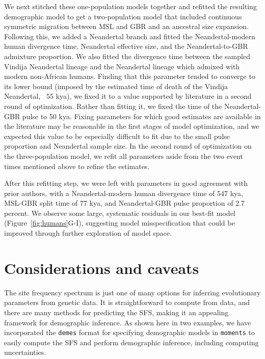 \documentclass[]{article}
\newcommand{\moments}{\texttt{moments}\xspace}
\newcommand{\demes}{\texttt{demes}\xspace}
\begin{document}
We next stitched these one-population models together and refitted the 
resulting demographic model to get a two-population model 
that included continuous symmetric 
migration between MSL and GBR and an ancestral size expansion. Following this,
we added a Neandertal branch and fitted the 
Neandertal-modern human divergence time, Neandertal effective size, and the 
Neandertal-to-GBR admixture proportion. We also fitted the divergence time 
between the sampled Vindija Neandertal lineage and the Neandertal lineage which 
admixed with modern non-African humans. Finding that this parameter tended to 
converge to its lower bound (imposed by the estimated time of death of the 
Vindija Neandertal, ~55 kya), we fixed it to a value supported by literature 
\citep[90 kya,][]{prufer2017high} in a second round of optimization.
Rather than fitting it, we fixed the time of the Neandertal-GBR pulse to 50 kya.
Fixing parameters for which good estimates are available in the literature 
\citep[see e.g.,][]{sumer2025earliest} may be reasonable in the first stages of 
model optimization, and we expected this value to be especially difficult to fit 
due to the small pulse proportion and Neandertal sample size. In the second 
round of optimization on the three-population model, we refit all parameters 
aside from the two event times mentioned above to refine the estimates. 

After this refitting step, we were left with parameters in good agreement with 
prior authors, with a Neandertal-modern human divergence time of 547 kya, 
MSL-GBR split time of 77 kya, and Neandertal-GBR pulse proportion of 2.7 
percent. We observe some large, systematic residuals in our best-fit model 
(Figure~\ref{fig:humans}G-I), suggesting model misspecification that could be
improved through further exploration of model space.


\section*{Considerations and caveats}\label{sec:conclusions}

The site frequency spectrum is just one of many options for inferring
evolutionary parameters from genetic data. It is straightforward to compute
from data, and there are many methods for predicting the SFS, making it an
appealing framework for demographic inference. As shown here in two examples,
we have incorporated the \demes format for specifying demographic models in
\moments to easily compute the SFS and perform demographic inference, including
computing uncertainties.
\end{document}
